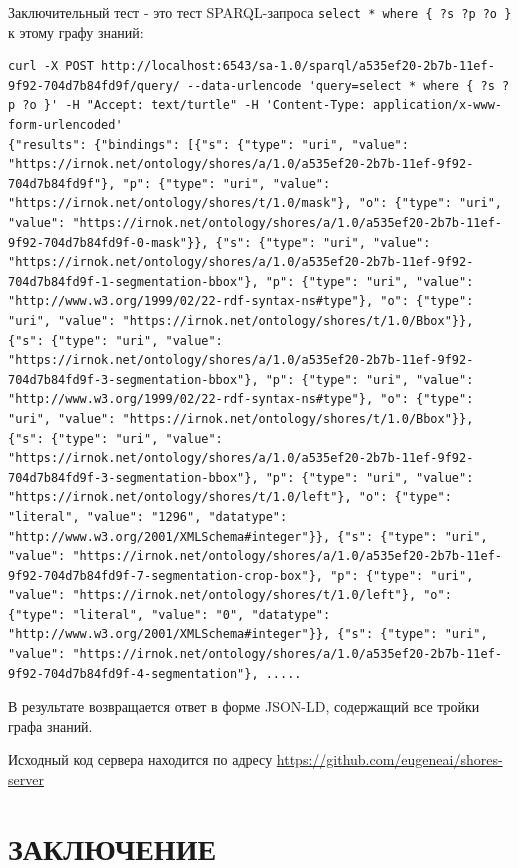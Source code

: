 \documentclass[732,14pt,final]{studrep}
\begin{document}
Заключительный тест - это тест SPARQL-запроса \verb|select * where { ?s ?p ?o }| к этому графу знаний:
\begin{verbatim}
curl -X POST http://localhost:6543/sa-1.0/sparql/a535ef20-2b7b-11ef-9f92-704d7b84fd9f/query/ --data-urlencode 'query=select * where { ?s ?p ?o }' -H "Accept: text/turtle" -H 'Content-Type: application/x-www-form-urlencoded'
{"results": {"bindings": [{"s": {"type": "uri", "value": "https://irnok.net/ontology/shores/a/1.0/a535ef20-2b7b-11ef-9f92-704d7b84fd9f"}, "p": {"type": "uri", "value": "https://irnok.net/ontology/shores/t/1.0/mask"}, "o": {"type": "uri", "value": "https://irnok.net/ontology/shores/a/1.0/a535ef20-2b7b-11ef-9f92-704d7b84fd9f-0-mask"}}, {"s": {"type": "uri", "value": "https://irnok.net/ontology/shores/a/1.0/a535ef20-2b7b-11ef-9f92-704d7b84fd9f-1-segmentation-bbox"}, "p": {"type": "uri", "value": "http://www.w3.org/1999/02/22-rdf-syntax-ns#type"}, "o": {"type": "uri", "value": "https://irnok.net/ontology/shores/t/1.0/Bbox"}}, {"s": {"type": "uri", "value": "https://irnok.net/ontology/shores/a/1.0/a535ef20-2b7b-11ef-9f92-704d7b84fd9f-3-segmentation-bbox"}, "p": {"type": "uri", "value": "http://www.w3.org/1999/02/22-rdf-syntax-ns#type"}, "o": {"type": "uri", "value": "https://irnok.net/ontology/shores/t/1.0/Bbox"}}, {"s": {"type": "uri", "value": "https://irnok.net/ontology/shores/a/1.0/a535ef20-2b7b-11ef-9f92-704d7b84fd9f-3-segmentation-bbox"}, "p": {"type": "uri", "value": "https://irnok.net/ontology/shores/t/1.0/left"}, "o": {"type": "literal", "value": "1296", "datatype": "http://www.w3.org/2001/XMLSchema#integer"}}, {"s": {"type": "uri", "value": "https://irnok.net/ontology/shores/a/1.0/a535ef20-2b7b-11ef-9f92-704d7b84fd9f-7-segmentation-crop-box"}, "p": {"type": "uri", "value": "https://irnok.net/ontology/shores/t/1.0/left"}, "o": {"type": "literal", "value": "0", "datatype": "http://www.w3.org/2001/XMLSchema#integer"}}, {"s": {"type": "uri", "value": "https://irnok.net/ontology/shores/a/1.0/a535ef20-2b7b-11ef-9f92-704d7b84fd9f-4-segmentation"}, .....
\end{verbatim}
В результате возвращается ответ в форме JSON-LD, содержащий все тройки графа знаний.

Исходный код сервера находится по адресу \url{https://github.com/eugeneai/shores-server}

\chapter*{ЗАКЛЮЧЕНИЕ}
\end{document}
